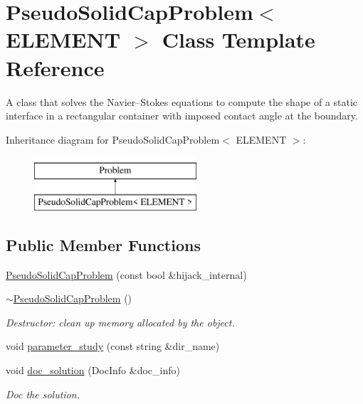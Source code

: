 \hypertarget{classPseudoSolidCapProblem}{}\section{Pseudo\+Solid\+Cap\+Problem$<$ E\+L\+E\+M\+E\+NT $>$ Class Template Reference}
\label{classPseudoSolidCapProblem}


A class that solves the Navier--Stokes equations to compute the shape of a static interface in a rectangular container with imposed contact angle at the boundary.  


Inheritance diagram for Pseudo\+Solid\+Cap\+Problem$<$ E\+L\+E\+M\+E\+NT $>$\+:\begin{figure}[H]
\begin{center}
\leavevmode
\includegraphics[height=2.000000cm]{classPseudoSolidCapProblem}
\end{center}
\end{figure}
\subsection*{Public Member Functions}
\begin{DoxyCompactItemize}
\item 
\hyperlink{classPseudoSolidCapProblem_a4ac05a07dd55950bb67f7f79cb9fbb77}{Pseudo\+Solid\+Cap\+Problem} (const bool \&hijack\+\_\+internal)
\item 
\hyperlink{classPseudoSolidCapProblem_aec2a79e44dfd785b2978419210b053b8}{$\sim$\+Pseudo\+Solid\+Cap\+Problem} ()
\begin{DoxyCompactList}\small\item\em Destructor\+: clean up memory allocated by the object. \end{DoxyCompactList}\item 
void \hyperlink{classPseudoSolidCapProblem_ae86ecaf62fa0920f5d14bf82a7f83b0e}{parameter\+\_\+study} (const string \&dir\+\_\+name)
\item 
void \hyperlink{classPseudoSolidCapProblem_a2fb98a37bde5742cbdf3c91cb1f5eb2f}{doc\+\_\+solution} (Doc\+Info \&doc\+\_\+info)
\begin{DoxyCompactList}\small\item\em Doc the solution. \end{DoxyCompactList}\end{DoxyCompactItemize}
